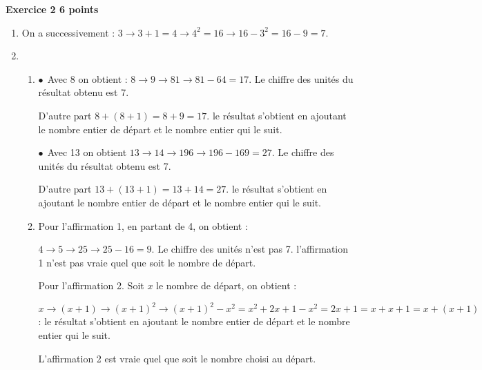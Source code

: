\textbf{Exercice 2 \hfill 6 points}

\medskip

% 

\begin{enumerate}
\item %

On a successivement : $3 \to 3 + 1 = 4 \to 4^2 = 16 \to 16 - 3^2 = 16 - 9 = 7$.
\item %


	\begin{enumerate}
		\item %
$\bullet~~$Avec 8 on obtient : $8 \to 9 \to 81 \to 81- 64 = 17$. Le chiffre des unités du résultat obtenu est 7.

D'autre part $8 + (8 + 1) = 8 + 9 = 17$. le résultat s'obtient en ajoutant le nombre entier de départ et le nombre entier qui le suit.

$\bullet~~$Avec 13 on obtient $13 \to 14 \to 196 \to 196 - 169 = 27$. Le chiffre des unités du résultat obtenu est 7.

D'autre part $13 + (13 + 1) = 13 + 14 = 27$. le résultat s'obtient en ajoutant le nombre entier de départ et le nombre entier qui le suit.
		\item %
		Pour l'affirmation 1, en partant de 4, on obtient :
		
		$4 \to 5 \to 25 \to 25 - 16 = 9$. Le chiffre des unités n'est pas 7. l'affirmation 1 n'est pas vraie quel que soit le nombre de départ.
		
		Pour l'affirmation 2. Soit $x$ le nombre de départ, on obtient :
		
$x \to (x + 1) \to (x + 1)^2 \to (x + 1)^2 - x^2 = x^2 + 2x + 1 - x ^2 = 2x + 1 = x + x + 1 = x + (x + 1)$ : le résultat s'obtient en ajoutant le nombre entier de départ et le nombre entier qui le suit.

L'affirmation 2 est vraie quel que soit le nombre choisi au départ.
	\end{enumerate}
\end{enumerate}

\bigskip


\bigskip

